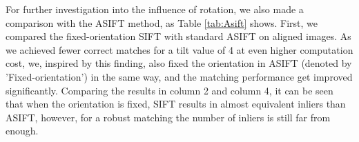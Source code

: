 
For further investigation into the influence of rotation, we also made a comparison with the ASIFT method, as Table \ref{tab:Asift} shows. 
First, we compared the fixed-orientation SIFT with standard ASIFT on aligned images.
As we achieved fewer correct matches for a tilt value of 4 at even higher computation cost, we, inspired by this finding, also fixed the orientation in ASIFT (denoted by 'Fixed-orientation') in the same way, and the matching performance get improved significantly.
Comparing the results in column 2 and column 4, it can be seen that when the orientation is fixed, SIFT results in almost equivalent inliers than ASIFT, however, for a robust matching the number of inliers is still far from enough.

